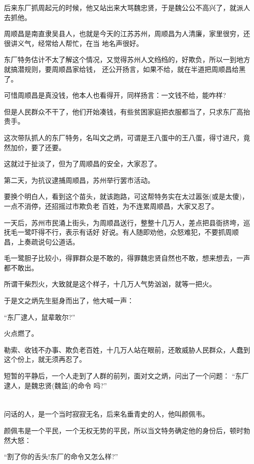 \documentclass[11pt,a4paper,onecolumn]{article}
\begin{document}
后来东厂抓周起元的时候，他又站出来大骂魏忠贤，于是魏公公不高兴了，就派人去抓他。

周顺昌是南直隶吴县人，也就是今天的江苏苏州，周顺昌为人清廉，家里很穷，还很讲义气，经常给人帮忙，在当
地名声很好。

东厂特务估计不太了解这个情况，又觉得苏州人文绉绉的，好欺负，所以一到地方就搞潜规则，要周顺昌家给钱，
还公开扬言，如果不给，就在半道把周顺昌给黑了。

可惜周顺昌是真没钱，他本人也看得开，同样扬言：一文钱不给，能咋样?

但是人民群众不干了，他们开始凑钱，有些贫困家庭把衣服都当了，只求东厂高抬贵手。

这次带队抓人的东厂特务，名叫文之炳，可谓是王八蛋中的王八蛋，得寸进尺，竟然加价，要了还要。

这就过于扯淡了，但为了周顺昌的安全，大家忍了。

第二天，为抗议逮捕周顺昌，苏州举行罢市活动。

要换个明白人，看到这个苗头，就该跑路，可这帮特务实在太过嚣张(或是太傻)，一点不消停，还招摇过市欺负老
百姓，为不连累周顺昌，大家又忍了。

一天后，苏州市民涌上街头，为周顺昌送行，整整十几万人，差点把县衙挤垮，巡抚毛一鹭吓得不行，表示有话好
好说。有人随即劝他，众怒难犯，不要抓周顺昌，上奏疏说句公道话。

毛一鹭胆子比较小，得罪群众是不敢的，得罪魏忠贤自然也不敢，想来想去，一声都不敢出。

所谓干柴烈火，大致就是这个样子，十几万人气势汹汹，就等一把火。

于是文之炳先生挺身而出了，他大喊一声：

``东厂逮人，鼠辈敢尔?''

火点燃了。

勒索、收钱不办事、欺负老百姓，十几万人站在眼前，还敢威胁人民群众，人蠢到这个份上，就无须再忍了。

短暂的平静后，一个人走到了人群的前列，面对文之炳，问出了一个问题： ``东厂逮人，是魏忠贤(魏监)的命令
吗?''

\section[\thesection]{}

问话的人，是一个当时寂寂无名，后来名垂青史的人，他叫颜佩韦。

颜佩韦是一个平民，一个无权无势的平民，所以当文特务确定他的身份后，顿时勃然大怒：

``割了你的舌头!东厂的命令又怎么样?''
\end{document}
